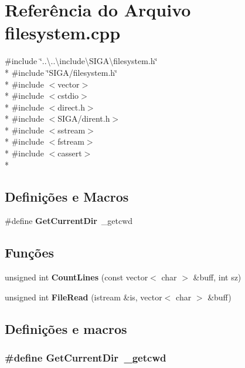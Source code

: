\section{Referência do Arquivo filesystem.\+cpp}
\label{filesystem_8cpp}
{\ttfamily \#include \char`\"{}..\textbackslash{}..\textbackslash{}include\textbackslash{}\+S\+I\+G\+A\textbackslash{}filesystem.\+h\char`\"{}}\\*
{\ttfamily \#include \char`\"{}S\+I\+G\+A/filesystem.\+h\char`\"{}}\\*
{\ttfamily \#include $<$vector$>$}\\*
{\ttfamily \#include $<$cstdio$>$}\\*
{\ttfamily \#include $<$direct.\+h$>$}\\*
{\ttfamily \#include $<$S\+I\+G\+A/dirent.\+h$>$}\\*
{\ttfamily \#include $<$sstream$>$}\\*
{\ttfamily \#include $<$fstream$>$}\\*
{\ttfamily \#include $<$cassert$>$}\\*
\subsection*{Definições e Macros}
\begin{DoxyCompactItemize}
\item 
\#define {\bf Get\+Current\+Dir}~\+\_\+getcwd
\end{DoxyCompactItemize}
\subsection*{Funções}
\begin{DoxyCompactItemize}
\item 
unsigned int {\bf Count\+Lines} (const vector$<$ char $>$ \&buff, int sz)
\item 
unsigned int {\bf File\+Read} (istream \&is, vector$<$ char $>$ \&buff)
\end{DoxyCompactItemize}


\subsection{Definições e macros}
\subsubsection[{Get\+Current\+Dir}]{\setlength{\rightskip}{0pt plus 5cm}\#define Get\+Current\+Dir~\+\_\+getcwd}\label{filesystem_8cpp_af0c0d1034a71f8aa3a08cda83c9d4e7a}


